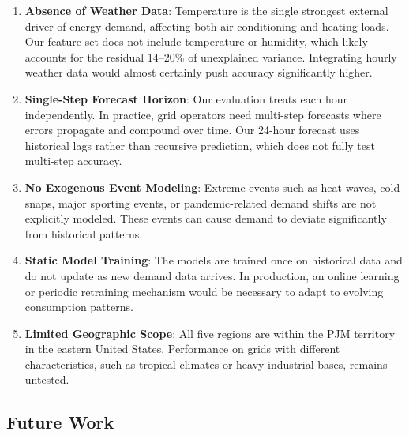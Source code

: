 \documentclass[conference]{IEEEtran}
\begin{document}
\begin{enumerate}
    \item \textbf{Absence of Weather Data}: Temperature is the single strongest external driver of energy demand, affecting both air conditioning and heating loads. Our feature set does not include temperature or humidity, which likely accounts for the residual 14--20\% of unexplained variance. Integrating hourly weather data would almost certainly push accuracy significantly higher.
    \item \textbf{Single-Step Forecast Horizon}: Our evaluation treats each hour independently. In practice, grid operators need multi-step forecasts where errors propagate and compound over time. Our 24-hour forecast uses historical lags rather than recursive prediction, which does not fully test multi-step accuracy.
    \item \textbf{No Exogenous Event Modeling}: Extreme events such as heat waves, cold snaps, major sporting events, or pandemic-related demand shifts are not explicitly modeled. These events can cause demand to deviate significantly from historical patterns.
    \item \textbf{Static Model Training}: The models are trained once on historical data and do not update as new demand data arrives. In production, an online learning or periodic retraining mechanism would be necessary to adapt to evolving consumption patterns.
    \item \textbf{Limited Geographic Scope}: All five regions are within the PJM territory in the eastern United States. Performance on grids with different characteristics, such as tropical climates or heavy industrial bases, remains untested.
\end{enumerate}

\subsection{Future Work}
\end{document}
